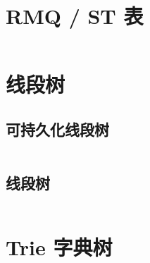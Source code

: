 \inputminted{cpp}{code/DateStructure/Other/LinearBasis.cpp}

\section{RMQ / ST 表}

\inputminted{cpp}{code/DateStructure/RMQ/RMQ.cpp}

\section{线段树}

\subsection{可持久化线段树}

\inputminted{cpp}{code/DateStructure/SegmentTree/PersistentSegmentTree.cpp}

\subsection{线段树}

\inputminted{cpp}{code/DateStructure/SegmentTree/SegmentTree1.cpp}

\section{Trie 字典树}

\inputminted{cpp}{code/DateStructure/TrieAndSet/Trie.cpp}

